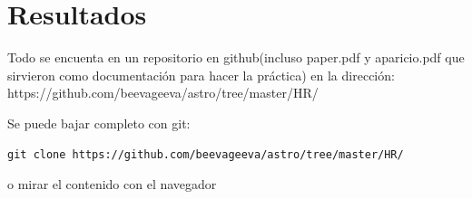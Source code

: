 \documentclass[10pt]{book}
\begin{document}
\section*{Resultados}
Todo se encuenta en un repositorio en github(incluso paper.pdf y aparicio.pdf que sirvieron como documentación para hacer la práctica) en la dirección: https://github.com/beevageeva/astro/tree/master/HR/

Se puede bajar completo con git:
\begin{verbatim}
git clone https://github.com/beevageeva/astro/tree/master/HR/  
\end{verbatim}
o mirar el contenido con el navegador








 
\end{document}
